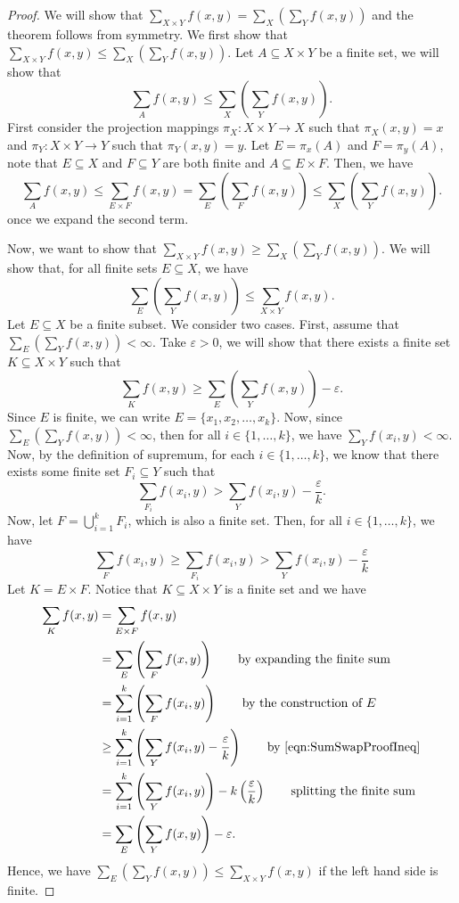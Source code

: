 \documentclass[11pt]{article} %
\theoremstyle{plain}
\begin{document}
\begin{proof}
We will show that $\sum_{X\times Y}f(x,y) = \sum_X \left(\sum_Y f(x,y)\right)$ and the theorem follows from symmetry. We first show that $\sum_{X\times Y}f(x,y) \leq \sum_X \left(\sum_Y f(x,y)\right)$. Let $A\subseteq X\times Y$ be a finite set, we will show that
\[\sum_{A}f(x,y)\leq \sum_X \left(\sum_Y f(x,y)\right).\]
First consider the projection mappings $\pi_X \colon X\times Y \to X$ such that $\pi_X(x,y)=x$ and $\pi_Y \colon X\times Y \to Y$ such that $\pi_Y(x,y) = y$. Let $E = \pi_x(A)$ and $F = \pi_y(A)$, note that $E\subseteq X$ and $F\subseteq Y$ are both finite and $A\subseteq E\times F$. Then, we have
\[\sum_A f(x,y) \leq \sum_{E\times F} f(x,y) = \sum_E \left(\sum_F f(x,y)\right) \leq \sum_X \left(\sum_Y f(x,y)\right).\]
once we expand the second term.

Now, we want to show that $\sum_{X\times Y}f(x,y) \geq \sum_X \left(\sum_Y f(x,y)\right)$. We will show that, for all finite sets $E\subseteq X$, we have
\[\sum_E \left(\sum_Y f(x,y)\right)\leq \sum_{X\times Y}f(x,y).\]
Let $E\subseteq X$ be a finite subset. We consider two cases. First, assume that $\sum_E \left(\sum_Y f(x,y)\right)<\infty$. Take $\varepsilon>0$, we will show that there exists a finite set $K\subseteq X\times Y$ such that
\[\sum_K f(x,y) \geq \sum_E \left(\sum_Y f(x,y)\right) - \varepsilon.\]
Since $E$ is finite, we can write $E = \{x_1, x_2, \ldots, x_k\}$. Now, since $\sum_E \left(\sum_Y f(x,y)\right)<\infty$, then for all $i\in\{1,\ldots,k\}$, we have $\sum_Y f(x_i,y) <\infty$. Now, by the definition of supremum, for each $i\in\{1,\ldots,k\}$, we know that there exists some finite set $F_i\subseteq Y$ such that
\[\sum_{F_i} f(x_i,y) > \sum_Y f(x_i,y) - \frac{\varepsilon}{k}.\]
Now, let $F = \bigcup_{i=1}^k F_i$, which is also a finite set. Then, for all $i\in\{1,\ldots,k\}$, we have
\begin{equation} \label{eqn:SumSwapProofIneq}
\sum_{F} f(x_i,y) \geq \sum_{F_i} f(x_i,y) > \sum_Y f(x_i,y) - \frac{\varepsilon}{k}
\end{equation}
Let $K = E\times F$. Notice that $K\subseteq X\times Y$ is a finite set and we have
\begin{align*}
\sum_K f(x,y) & = \sum_{E\times F} f(x,y) \\
& = \sum_E \left(\sum_F f(x,y)\right) \qquad \text{by expanding the finite sum} \\
& = \sum_{i=1}^k \left(\sum_F f(x_i,y)\right) \qquad \text{by the construction of }E \\
& \geq \sum_{i=1}^k \left(\sum_Y f(x_i,y) - \frac{\varepsilon}{k}\right) \qquad \text{by \Cref{eqn:SumSwapProofIneq}} \\
&  = \sum_{i=1}^k \left(\sum_Y f(x_i,y)\right) - k \left( \frac{\varepsilon}{k} \right) \qquad \text{splitting the finite sum} \\
& = \sum_E \left(\sum_Y f(x,y)\right) -\varepsilon.
\end{align*}
Hence, we have $\sum_E \left(\sum_Y f(x,y)\right)\leq \sum_{X\times Y}f(x,y)$ if the left hand side is finite.


\end{proof}
\end{document}
